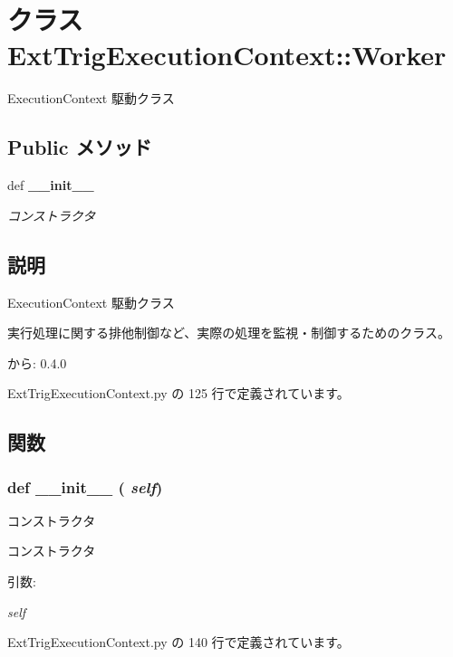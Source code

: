 \section{クラス ExtTrigExecutionContext::Worker}
\label{classsource__py_1_1_ext_trig_execution_context_1_1_ext_trig_execution_context_1_1_worker}
ExecutionContext 駆動クラス  


\subsection*{Public メソッド}
\begin{CompactItemize}
\item 
def {\bf \_\-\_\-init\_\-\_\-}
\begin{CompactList}\small\item\em コンストラクタ \item\end{CompactList}\end{CompactItemize}


\subsection{説明}
ExecutionContext 駆動クラス 

実行処理に関する排他制御など、実際の処理を監視・制御するためのクラス。

\begin{Desc}
\item[から:]0.4.0 \end{Desc}


 ExtTrigExecutionContext.py の 125 行で定義されています。

\subsection{関数}
\subsubsection{\setlength{\rightskip}{0pt plus 5cm}def \_\-\_\-init\_\-\_\- ( {\em self})}\label{classsource__py_1_1_ext_trig_execution_context_1_1_ext_trig_execution_context_1_1_worker_c775ee34451fdfa742b318538164070e}


コンストラクタ 

コンストラクタ

\begin{Desc}
\item[引数:]
\begin{description}
\item[{\em self}]\end{description}
\end{Desc}


 ExtTrigExecutionContext.py の 140 行で定義されています。